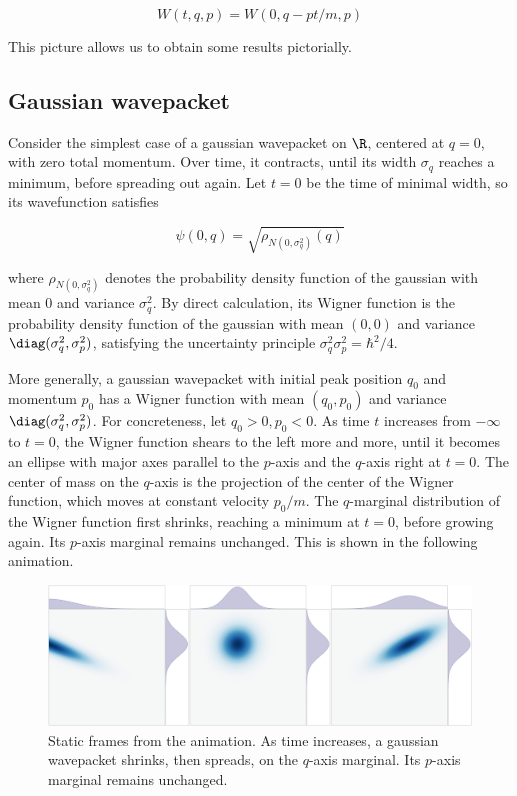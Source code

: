 $$
W(t, q, p) = W(0, q - pt/m, p)
$$

This picture allows us to obtain some results pictorially.

\subsection{Gaussian wavepacket}

Consider the simplest case of a gaussian wavepacket on $\R$, centered
at $q = 0$, with zero total momentum. Over time, it contracts, until
its width $\sigma_q$ reaches a minimum, before spreading out again.
Let $t = 0$ be the time of minimal width, so its wavefunction
satisfies

$$
\psi(0, q) = \sqrt{\rho_{N (0, \sigma_q^2)}(q)}
$$

where $\rho_{N (0, \sigma_q^2)}$ denotes the probability density
function of the gaussian with mean $0$ and variance $\sigma_q^2$. By
direct calculation, its Wigner function is the probability density
function of the gaussian with mean $(0, 0)$ and variance
$\diag(\sigma_q^2, \sigma_p^2)$, satisfying the uncertainty principle
$\sigma_q^2 \sigma_p^2 = \hbar^2/4$.

More generally, a gaussian wavepacket with initial peak position $q_0$
and momentum $p_0$ has a Wigner function with mean $(q_0, p_0)$ and
variance $\diag(\sigma_q^2, \sigma_p^2)$. For concreteness, let
$q_0 > 0, p_0 < 0$. As time $t$ increases from $-\infty$ to
$t = 0$, the Wigner function shears to the left more and more, until
it becomes an ellipse with major axes parallel to the $p$-axis and the
$q$-axis right at $t = 0$. The center of mass on the $q$-axis is
the projection of the center of the Wigner function, which moves at
constant velocity $p_0/m$. The $q$-marginal distribution of the
Wigner function first shrinks, reaching a minimum at $t = 0$, before
growing again. Its $p$-axis marginal remains unchanged. This is shown
in the following animation.

\begin{figure}
\centering
\includegraphics{figure/shear_wigner.png}
\caption{Static frames from the animation. As time increases, a gaussian
wavepacket shrinks, then spreads, on the $q$-axis marginal. Its
$p$-axis marginal remains unchanged.}
\end{figure}

